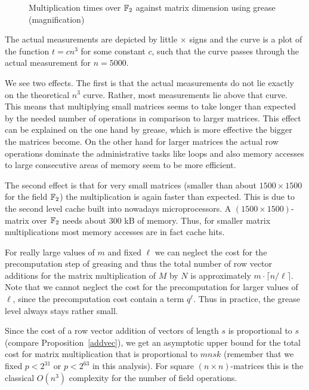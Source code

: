 \begin{figure}[ht]
\begin{center}
\end{center}
\caption{Multiplication times over $\mathbb{F}_2$ against matrix dimension
using grease
(magnification)}
\label{matmulgrease_scaled}
%
\end{figure}

The actual measurements are depicted by little $\times$ signs and
the curve is a plot of the function $t = cn^3$ for some constant $c$, such
that the curve passes through the actual measurement for $n=5000$.

We see two effects. The first is that the actual measurements do not lie
exactly on the theoretical $n^3$ curve. Rather, most measurements lie above
that curve. This means that multiplying small matrices seems to take
longer than expected by the needed number of operations in comparison 
to larger matrices. This effect can be explained on the one hand by grease,
which is more effective the bigger the matrices become. On the other hand
for larger matrices the actual row operations dominate the administrative
tasks like loops and also memory accesses to large consecutive areas of
memory seem to be more efficient.

The second effect is that for very small matrices (smaller than about $1500
\times 1500$ for the field $\mathbb{F}_2$) the multiplication is again faster
than expected. This is due to the second level cache built into nowadays
microprocessors. A $(1500\times 1500)$-matrix over $\mathbb{F}_2$ needs about
$300$ kB of memory. Thus, for smaller matrix multiplications most memory
accesses are in fact cache hits.

For really large values of $m$ and fixed $\ell$ we can neglect the cost for the
precomputation step of greasing and thus the total number of row 
vector additions for the matrix multiplication of $M$ by $N$ is
approximately $m \cdot \lceil n/\ell \rceil$. Note that we cannot
neglect the cost for the precomputation for larger values of $\ell$,
since the precomputation cost contain a term $q^\ell$. Thus in practice,
the grease level always stays rather small.

Since the cost of
a row vector addition of vectors of length $s$ is proportional
to $s$ (compare Proposition~\ref{addvec}), we get an asymptotic upper
bound for the total cost for matrix multiplication that is proportional
to $mnsk$ (remember that we fixed $p < 2^{31}$ or $p< 2^{63}$ in this
analysis). For square $(n \times n)$-matrices this is the classical
$O(n^3)$ complexity for the number of field operations.

